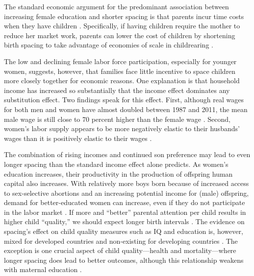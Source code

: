 \documentclass[12pt,letterpaper]{article}
\begin{document}
The standard economic argument for the predominant association between
increasing female education and shorter spacing is that parents incur
time costs when they have children \citep{Hotz1997,schultz97}.
Specifically, if having children require the mother to reduce her market work, parents 
can lower the cost of children by shortening birth spacing to 
take advantage of economies of scale in childrearing \citep{Vijverberg1982}.

The low and declining female labor force participation, especially for younger women, 
suggests, however, that families face little incentive to space children more closely 
together for economic reasons.
One explanation is that household income has increased so substantially that the income 
effect dominates any substitution effect.
Two findings speak for this effect.
First, although real wages for both men and women have almost doubled between 1987 and 
2011, the mean male wage is still close to 70 percent higher than the female wage 
\citep{Klasen2015,Bhargava2018}.
Second, women’s labor supply appears to be more negatively elastic to their husbands' 
wages than it is positively elastic to their wages \citep{Bhargava2018}.

The combination of rising incomes and continued son preference may lead to even longer 
spacing than the standard income effect alone predicts.
As women's education increases, their productivity in the production of offspring human 
capital also increases.
With relatively more boys born because of increased access to sex-selective 
abortions and an increasing potential income for (male) offspring, demand for 
better-educated women can increase, even if they do not participate in the labor market 
\citep{Behrman1999}.
If more and ``better'' parental attention per child results in higher child ``quality,'' 
we should expect longer birth intervals 
\citep{Zajonc1975,Zajonc1976,Razin1980}.
The evidence on spacing's effect on child quality measures such as IQ 
and education is, however, mixed for developed countries and non-existing 
for developing countries
\citep{Powell1993,Pettersson-Lidbom2009,Buckles2012,Barclay2017}.
The exception is one crucial aspect of child quality---health and mortality---where
longer spacing does lead to better outcomes, although this relationship weakens with 
maternal education \citep{Whitworth2002,Conde-Agudelo2012,Molitoris2019}.

\end{document}
